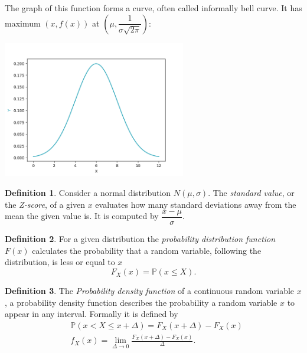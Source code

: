 \documentclass[11pt, a4paper]{article}
\theoremstyle{definition}
\newtheorem{definition}{Definition}
\begin{document}
		The graph of this function forms a curve, often called informally bell curve. It has maximum $(x,f(x))$ at $\left(\mu, \dfrac{1}{\sigma\sqrt{2\pi}}\right)$:
		\begin{center}
			\includegraphics[width=0.6\textwidth]{Normal_clean}
		\end{center}
		
		\begin{definition}
			\label{def:def2}
			Consider a normal distribution $N(\mu, \sigma)$. The \emph{standard value}, or the \emph{Z-score}, of a given $x$ evaluates how many standard deviations away from the mean the given value is. It is computed by $\dfrac{x-\mu}{\sigma}$.
		\end{definition}
	
		\begin{definition}
			\label{def:prob_dist}
			For a given distribution the \emph{probability distribution function} $F(x)$ calculates the probability that a random variable, following the distribution, is less or equal to $x$
			$$F_{X}(x)=\mathbb{P}(x\leq X).$$
		\end{definition}
	
		\begin{definition}
			\label{def:prob_dens}
			The \emph{Probability density function} of a continuous random variable $x$, a probability density function describes the probability a random variable $x$ to appear in any interval. Formally it is defined by
			\begin{align*}
				&\mathbb{P}(x < X \leq x+\Delta)=F_X(x+\Delta)-F_X(x)\\
				&f_X(x)=\lim_{\Delta \rightarrow 0} \frac{F_X(x+\Delta)-F_X(x)}{\Delta}.		
			\end{align*}
		\end{definition}
	
\end{document}
